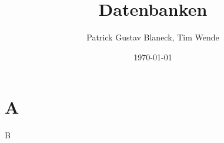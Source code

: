 \documentclass{zettel}
\title{Datenbanken}
\author{Patrick Gustav Blaneck, Tim Wende}
\date{\today}
\begin{document}
\maketitle
\tableofcontents

\newpage

\section{A}

B
\end{document}
